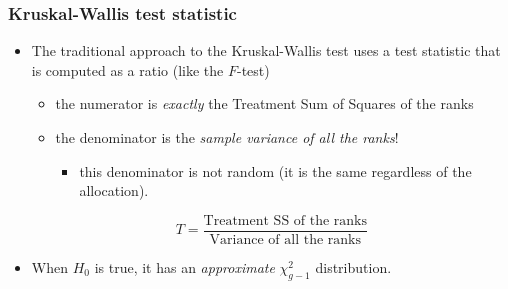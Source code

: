 \documentclass[a4paper]{article}\usepackage[]{graphicx}\usepackage[]{xcolor}
\begin{document}
\subsubsection{Kruskal-Wallis test statistic}
\begin{itemize}
	\item The traditional approach to the Kruskal-Wallis test uses a test statistic that is computed as a ratio (like the \( F \)-test)
	\begin{itemize}
		\item the numerator is \textit{exactly} the Treatment Sum of Squares of the ranks
		\item the denominator is the \textit{sample variance of all the ranks}!
		\begin{itemize}
			\item this denominator is not random (it is the same regardless of the allocation).
		\end{itemize}
	\end{itemize}
	\[
		T = \frac{\text{Treatment SS of the ranks}}{\text{Variance of all the ranks}}
	\]
	\item When \( H_0 \) is true, it has an \textit{approximate} \( \chi^{2}_{g-1} \) distribution. 
\end{itemize}
\end{document}
